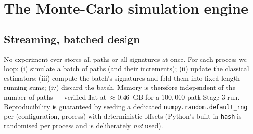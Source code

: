 \documentclass[11pt]{article}
\newcommand{\code}[1]{\texttt{#1}}
\begin{document}
\section{The Monte-Carlo simulation engine}\label{sec:mc}
\subsection{Streaming, batched design}
No experiment ever stores all paths or all signatures at once. For each process we
loop: (i) simulate a batch of paths (and their increments); (ii) update the
classical estimators; (iii) compute the batch's signatures and fold them into
fixed-length running sums; (iv) discard the batch. Memory is therefore independent
of the number of paths --- verified flat at $\approx0.46$~GB for a $100{,}000$-path
Stage-3 run. Reproducibility is guaranteed by seeding a dedicated
\code{numpy.random.default\_rng} per (configuration, process) with deterministic
offsets (Python's built-in \code{hash} is randomised per process and is
deliberately \emph{not} used).
\end{document}
